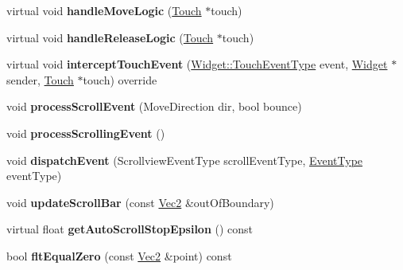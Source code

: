\begin{DoxyCompactItemize}
\item 
\mbox{\label{classui_1_1ScrollView_a0171c8a1f2c87e46804ac8b524353c87}} 
virtual void {\bfseries handle\+Move\+Logic} (\hyperlink{classTouch}{Touch} $\ast$touch)
\item 
\mbox{\label{classui_1_1ScrollView_afcee62775ac32e84e6344605f0a74def}} 
virtual void {\bfseries handle\+Release\+Logic} (\hyperlink{classTouch}{Touch} $\ast$touch)
\item 
\mbox{\label{classui_1_1ScrollView_a00a1264e9ae1025c78942d7366c28736}} 
virtual void {\bfseries intercept\+Touch\+Event} (\hyperlink{classui_1_1Widget_a4829c0f1cbaf1fd820a9b2ccf0c58c73}{Widget\+::\+Touch\+Event\+Type} event, \hyperlink{classui_1_1Widget}{Widget} $\ast$sender, \hyperlink{classTouch}{Touch} $\ast$touch) override
\item 
\mbox{\label{classui_1_1ScrollView_ae4842fb3ed6cb5e1dd5e4b30a220b2d0}} 
void {\bfseries process\+Scroll\+Event} (Move\+Direction dir, bool bounce)
\item 
\mbox{\label{classui_1_1ScrollView_a33c3a3cc468dcb6e5504beebf8c4320e}} 
void {\bfseries process\+Scrolling\+Event} ()
\item 
\mbox{\label{classui_1_1ScrollView_adccefe4659464efd992e5169f8f8ec0e}} 
void {\bfseries dispatch\+Event} (Scrollview\+Event\+Type scroll\+Event\+Type, \hyperlink{classui_1_1ScrollView_ac2a08f5665cbbfbff86fe7abdb6fbb02}{Event\+Type} event\+Type)
\item 
\mbox{\label{classui_1_1ScrollView_afe4f0cf518a1b09d427b26d8379dcac5}} 
void {\bfseries update\+Scroll\+Bar} (const \hyperlink{classVec2}{Vec2} \&out\+Of\+Boundary)
\item 
\mbox{\label{classui_1_1ScrollView_a4886f931b8e5e03e8d8aba01a9f02930}} 
virtual float {\bfseries get\+Auto\+Scroll\+Stop\+Epsilon} () const
\item 
\mbox{\label{classui_1_1ScrollView_adc223ee22f6251008e2979178e86f9ad}} 
bool {\bfseries flt\+Equal\+Zero} (const \hyperlink{classVec2}{Vec2} \&point) const

\end{DoxyCompactItemize}
